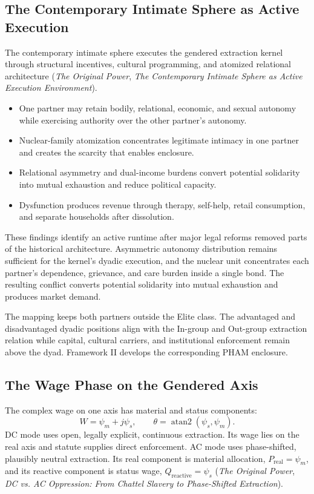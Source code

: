 \documentclass[12pt]{article}
\newcommand{\OP}{\textit{The Original Power}}
\begin{document}
\subsection{The Contemporary Intimate Sphere as Active Execution}

The contemporary intimate sphere executes the gendered extraction kernel through structural incentives, cultural programming, and atomized relational architecture (\OP{}, \textit{The Contemporary Intimate Sphere as Active Execution Environment}).

\begin{itemize}
  \item One partner may retain bodily, relational, economic, and sexual autonomy while exercising authority over the other partner's autonomy.
  \item Nuclear-family atomization concentrates legitimate intimacy in one partner and creates the scarcity that enables enclosure.
  \item Relational asymmetry and dual-income burdens convert potential solidarity into mutual exhaustion and reduce political capacity.
  \item Dysfunction produces revenue through therapy, self-help, retail consumption, and separate households after dissolution.
\end{itemize}

These findings identify an active runtime after major legal reforms removed parts of the historical architecture. Asymmetric autonomy distribution remains sufficient for the kernel's dyadic execution, and the nuclear unit concentrates each partner's dependence, grievance, and care burden inside a single bond. The resulting conflict converts potential solidarity into mutual exhaustion and produces market demand.

The mapping keeps both partners outside the Elite class. The advantaged and disadvantaged dyadic positions align with the In-group and Out-group extraction relation while capital, cultural carriers, and institutional enforcement remain above the dyad. Framework II develops the corresponding PHAM enclosure.

\subsection{The Wage Phase on the Gendered Axis}
\label{sec:wage_phase}

The complex wage on one axis has material and status components:
\begin{equation}
  W = \psi_m + j\psi_s,
  \qquad
  \theta = \operatorname{atan2}(\psi_s,\psi_m).
\end{equation}
DC mode uses open, legally explicit, continuous extraction. Its wage lies on the real axis and statute supplies direct enforcement. AC mode uses phase-shifted, plausibly neutral extraction. Its real component is material allocation, $P_{\text{real}}=\psi_m$, and its reactive component is status wage, $Q_{\text{reactive}}=\psi_s$ (\OP{}, \textit{DC vs. AC Oppression: From Chattel Slavery to Phase-Shifted Extraction}).
\end{document}
